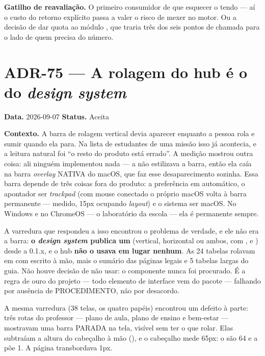 \textbf{Gatilho de reavaliação.} O primeiro consumidor de  que
esquecer o  tendo  --- aí o custo do retorno
explícito passa a valer o risco de mexer no motor. Ou a decisão de dar quota ao
módulo , que traria três dos seis pontos de chamada para o lado de
quem precisa do número.

\section{ADR-75 --- A rolagem do hub é o  do \emph{design system}}
\label{adr:75}

\textbf{Data.} 2026-09-07 \quad \textbf{Status.} Aceita

\textbf{Contexto.} A barra de rolagem vertical devia aparecer enquanto a pessoa
rola e sumir quando ela para. Na lista de estudantes de uma missão isso já
acontecia, e a leitura natural foi \enquote{o resto do produto está errado}. A
medição mostrou outra coisa: ali ninguém implementou nada --- a
 não estilizava a barra, então ela caía na barra
\emph{overlay} NATIVA do macOS, que faz esse desaparecimento sozinha. Essa barra
depende de três coisas fora do produto: a preferência  em
automático, o apontador ser \emph{trackpad} (com mouse conectado o próprio macOS
volta à barra permanente --- medido, 15px ocupando \emph{layout}) e o sistema ser
macOS. No Windows e no ChromeOS --- o laboratório da escola --- ela é permanente
sempre.

A varredura que respondeu a isso encontrou o problema de verdade, e ele não era
a barra: \textbf{o \emph{design system} publica um } (vertical,
horizontal ou ambos, com ,  e ) desde a
0.1.x, e o hub \textbf{não o usava em lugar nenhum}. As 24 tabelas rolavam em
 com  escrito à mão, mais o sumário das páginas legais e
5 tabelas largas do guia. Não houve decisão de não usar: o componente nunca foi
procurado. É a regra de ouro do projeto --- todo elemento de interface vem do
pacote --- falhando por ausência de PROCEDIMENTO, não por desacordo.

A mesma varredura (38 telas, os quatro papéis) encontrou um defeito à parte:
três rotas do professor --- plano de aula, plano de ensino e bem-estar ---
mostravam uma barra PARADA na tela, visível sem ter o que rolar. Elas subtraíam a
altura do cabeçalho à mão (), e o cabeçalho mede 65px: o
 são 64 e a  põe 1. A página transbordava 1px.

